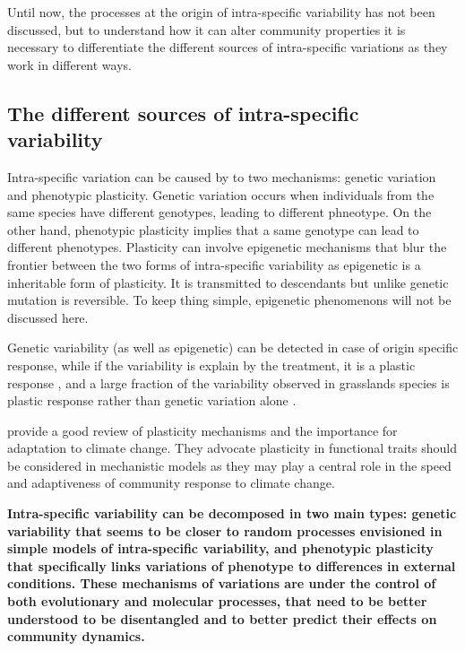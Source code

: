 Until now, the processes at the origin of intra-specific variability has not been discussed, but to understand how it can alter community properties it is necessary to differentiate the different sources of intra-specific variations as they work in different ways.

\subsection{The different sources of intra-specific variability}

Intra-specific variation can be caused by to two mechanisms: genetic variation and phenotypic plasticity. Genetic variation occurs when individuals from the same species have different genotypes, leading to different phneotype. On the other hand, phenotypic plasticity implies that a same genotype can lead to different phenotypes. Plasticity can involve epigenetic mechanisms \parencite{
zhang_epigenetic_2013, nicotra_adaptive_2015, beaman_evolution_2016} that blur the frontier between the two forms of intra-specific variability as epigenetic is a inheritable form of plasticity. It is transmitted to descendants but unlike genetic mutation is reversible. To keep thing simple, epigenetic phenomenons will not be discussed here.

Genetic variability (as well as epigenetic) can be detected in case of origin specific response, while if the variability is explain by the treatment, it is a plastic response \parencite{frei_plastic_2014}, and a large fraction of the variability observed in grasslands species is plastic response rather than genetic variation alone \parencite{frei_plastic_2014, merila_climate_2014}.

\cite{nicotra_plant_2010} provide a good review of plasticity mechanisms and the importance for adaptation to climate change. They advocate plasticity in functional traits should be considered in mechanistic models as they may play a central role in the speed and adaptiveness of community response to climate change.


\textbf{Intra-specific variability can be decomposed in two main types: genetic variability that seems to be closer to random processes envisioned in simple models of intra-specific variability, and phenotypic plasticity that specifically links variations of phenotype to differences in external conditions. These mechanisms of variations are under the control of both evolutionary and molecular processes, that need to be better understood to be disentangled and to better predict their effects on community dynamics.}

